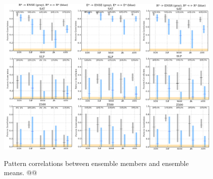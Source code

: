 \documentclass[12pt]{article}
\begin{document}
\begin{figure}[t]
  \noindent\includegraphics[width=39pc,angle=0]{pattcorrs_rande_ens.pdf}\\
  \caption{Pattern correlations between ensemble members and ensemble means. @@
}\label{fig:pcbars}
\end{figure}


\clearpage


\end{document}
